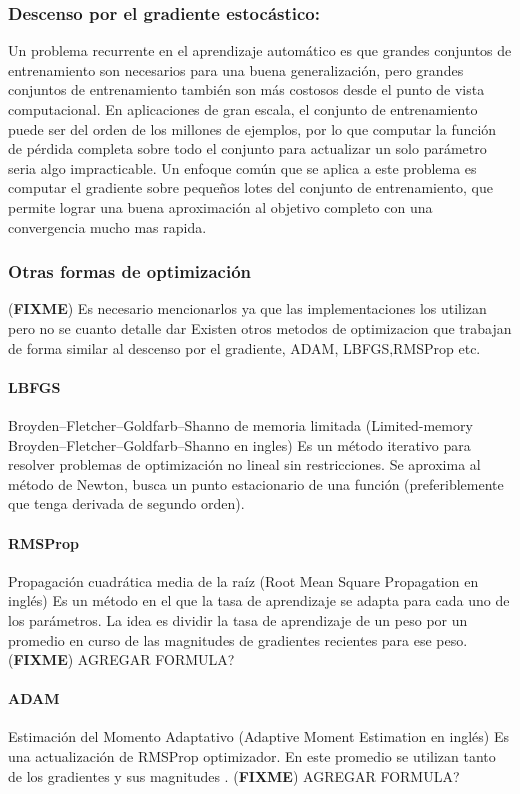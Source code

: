 \documentclass[a4paper,11pt,spanish]{book}
\newcommand*{\FIXME}[1]{{(\textbf{FIXME}) {#1}}}
\begin{document}
      \subsubsection{Descenso por el gradiente estocástico:}
	Un problema recurrente en el aprendizaje automático es que grandes conjuntos de entrenamiento son necesarios para una buena generalización, 
	pero grandes conjuntos de entrenamiento también son más costosos desde el punto de vista computacional.
	En aplicaciones de gran escala, el conjunto de entrenamiento puede ser del orden de los millones de ejemplos, por lo que computar la función de 
	pérdida completa sobre todo el conjunto para actualizar un solo parámetro seria algo impracticable.
	Un enfoque común que se aplica a este problema es computar el gradiente sobre pequeños lotes del conjunto de entrenamiento, 
	que permite lograr una buena aproximación al objetivo completo con una convergencia mucho mas rapida.


      \subsubsection{Otras formas de optimización}
	\FIXME{Es necesario mencionarlos ya que las implementaciones los utilizan pero no se cuanto detalle dar}
	Existen otros metodos de optimizacion que trabajan de forma similar al descenso por el gradiente, ADAM, LBFGS,RMSProp etc. 
	\paragraph{LBFGS} Broyden–Fletcher–Goldfarb–Shanno de memoria limitada (Limited-memory  Broyden–Fletcher–Goldfarb–Shanno en ingles) Es un método iterativo para resolver problemas de optimización 
	no lineal sin restricciones. Se aproxima al método de Newton,  busca un punto estacionario de una función (preferiblemente que tenga derivada de segundo orden). 
	\paragraph{RMSProp} Propagación cuadrática media de la raíz (Root Mean Square Propagation en inglés) Es un método en el que la tasa de aprendizaje se adapta para cada uno de los parámetros. 
	  La idea es dividir la tasa de aprendizaje de un peso por un promedio en curso de las magnitudes de gradientes recientes para ese peso.
	  \FIXME{AGREGAR FORMULA?}
	\paragraph{ADAM} Estimación del Momento Adaptativo (Adaptive Moment Estimation en inglés) Es una actualización de RMSProp optimizador. 
	  En este promedio se utilizan tanto de los gradientes y sus magnitudes . \FIXME{AGREGAR FORMULA?}
	
\end{document}
